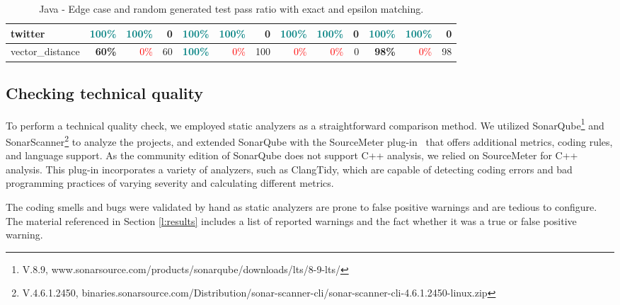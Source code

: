 \begin{table}[!h]
{\begin{tabular}{|p{2.9cm}|rr|r|rr|r||rr|r|rr|r|}
		twitter            & \textcolor{teal}{100\%}              & \multicolumn{1}{r|}{\textcolor{teal}{100\%}}          & \cellcolor[HTML]{FFFFFF}0    & \textcolor{teal}{100\%}          & \multicolumn{1}{r|}{\textcolor{teal}{100\%}}          & \cellcolor[HTML]{FFFFFF}0    & \textcolor{teal}{100\%}              & \multicolumn{1}{r|}{\textcolor{teal}{100\%}} & \cellcolor[HTML]{FFFFFF}0    & \textcolor{teal}{100\%}          & \multicolumn{1}{r|}{\textcolor{teal}{100\%}}          & \cellcolor[HTML]{FFFFFF}0    \\ \hline
		vector\_distance   & \textbf{60\%}                        & \multicolumn{1}{r|}{\textcolor{red}{0\%}}             & \cellcolor[HTML]{FFC266}60   & \textcolor{teal}{\textbf{100\%}} & \multicolumn{1}{r|}{\textcolor{red}{0\%}}             & \cellcolor[HTML]{FF9900}100  & \textcolor{red}{0\%}                 & \multicolumn{1}{r|}{\textcolor{red}{0\%}}    & \cellcolor[HTML]{FFFFFF}0    & \textbf{98\%}                    & \multicolumn{1}{r|}{\textcolor{red}{0\%}}             & \cellcolor[HTML]{FF9C06}98   \\ \hline
	\end{tabular}
  }
	\vspace{2px}
	\caption{Java - Edge case and random generated test pass ratio with exact and epsilon matching.}
	\label{t:tests-java}
\end{table}

\subsection{Checking technical quality}
\label{eval_static}


To perform a technical quality check, we employed static analyzers as a straightforward comparison method.
We utilized SonarQube\footnote{V.8.9, www.sonarsource.com/products/sonarqube/downloads/lts/8-9-lts/} and SonarScanner\footnote{V.4.6.1.2450, binaries.sonarsource.com/Distribution/sonar-scanner-cli/sonar-scanner-cli-4.6.1.2450-linux.zip} to analyze the projects, and extended SonarQube with the SourceMeter plug-in~\cite{sonar_plugin_sm} that offers additional metrics, coding rules, and language support.
As the community edition of SonarQube does not support C++ analysis, we relied on SourceMeter for C++ analysis.
This plug-in incorporates a variety of analyzers, such as ClangTidy, which are capable of detecting coding errors and bad programming practices of varying severity and calculating different metrics.


The coding smells and bugs were validated by hand as static analyzers are prone to false positive warnings and are tedious to configure.
The material referenced in Section \ref{l:results} includes a list of reported warnings and the fact whether it was a true or false positive warning.

